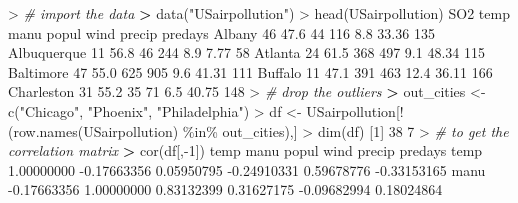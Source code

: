 \documentclass[
]{article}
\newenvironment{Shaded}{\begin{snugshade}}{\end{snugshade}}
\newcommand{\CommentTok}[1]{\textcolor[rgb]{0.56,0.35,0.01}{\textit{#1}}}
\newcommand{\DecValTok}[1]{\textcolor[rgb]{0.00,0.00,0.81}{#1}}
\newcommand{\ErrorTok}[1]{\textcolor[rgb]{0.64,0.00,0.00}{\textbf{#1}}}
\newcommand{\FloatTok}[1]{\textcolor[rgb]{0.00,0.00,0.81}{#1}}
\newcommand{\FunctionTok}[1]{\textcolor[rgb]{0.00,0.00,0.00}{#1}}
\newcommand{\NormalTok}[1]{#1}
\newcommand{\OtherTok}[1]{\textcolor[rgb]{0.56,0.35,0.01}{#1}}
\newcommand{\SpecialCharTok}[1]{\textcolor[rgb]{0.00,0.00,0.00}{#1}}
\newcommand{\StringTok}[1]{\textcolor[rgb]{0.31,0.60,0.02}{#1}}
\begin{document}
\begin{Shaded}
\begin{Highlighting}[]
\SpecialCharTok{\textgreater{}} \CommentTok{\# import the data}
\ErrorTok{\textgreater{}} \FunctionTok{data}\NormalTok{(}\StringTok{"USairpollution"}\NormalTok{)}
\SpecialCharTok{\textgreater{}} \FunctionTok{head}\NormalTok{(USairpollution)}
\NormalTok{            SO2 temp manu popul wind precip predays}
\NormalTok{Albany       }\DecValTok{46} \FloatTok{47.6}   \DecValTok{44}   \DecValTok{116}  \FloatTok{8.8}  \FloatTok{33.36}     \DecValTok{135}
\NormalTok{Albuquerque  }\DecValTok{11} \FloatTok{56.8}   \DecValTok{46}   \DecValTok{244}  \FloatTok{8.9}   \FloatTok{7.77}      \DecValTok{58}
\NormalTok{Atlanta      }\DecValTok{24} \FloatTok{61.5}  \DecValTok{368}   \DecValTok{497}  \FloatTok{9.1}  \FloatTok{48.34}     \DecValTok{115}
\NormalTok{Baltimore    }\DecValTok{47} \FloatTok{55.0}  \DecValTok{625}   \DecValTok{905}  \FloatTok{9.6}  \FloatTok{41.31}     \DecValTok{111}
\NormalTok{Buffalo      }\DecValTok{11} \FloatTok{47.1}  \DecValTok{391}   \DecValTok{463} \FloatTok{12.4}  \FloatTok{36.11}     \DecValTok{166}
\NormalTok{Charleston   }\DecValTok{31} \FloatTok{55.2}   \DecValTok{35}    \DecValTok{71}  \FloatTok{6.5}  \FloatTok{40.75}     \DecValTok{148}
\SpecialCharTok{\textgreater{}} \CommentTok{\# drop the outliers }
\ErrorTok{\textgreater{}}\NormalTok{ out\_cities }\OtherTok{\textless{}{-}} \FunctionTok{c}\NormalTok{(}\StringTok{"Chicago"}\NormalTok{, }\StringTok{"Phoenix"}\NormalTok{, }\StringTok{"Philadelphia"}\NormalTok{)}
\SpecialCharTok{\textgreater{}}\NormalTok{ df }\OtherTok{\textless{}{-}}\NormalTok{ USairpollution[}\SpecialCharTok{!}\NormalTok{(}\FunctionTok{row.names}\NormalTok{(USairpollution) }\SpecialCharTok{\%in\%}\NormalTok{ out\_cities),]}
\SpecialCharTok{\textgreater{}} \FunctionTok{dim}\NormalTok{(df)}
\NormalTok{[}\DecValTok{1}\NormalTok{] }\DecValTok{38}  \DecValTok{7}
\SpecialCharTok{\textgreater{}} \CommentTok{\# to get the correlation matrix}
\ErrorTok{\textgreater{}} \FunctionTok{cor}\NormalTok{(df[,}\SpecialCharTok{{-}}\DecValTok{1}\NormalTok{])}
\NormalTok{               temp        manu       popul        wind      precip     predays}
\NormalTok{temp     }\FloatTok{1.00000000} \SpecialCharTok{{-}}\FloatTok{0.17663356}  \FloatTok{0.05950795} \SpecialCharTok{{-}}\FloatTok{0.24910331}  \FloatTok{0.59678776} \SpecialCharTok{{-}}\FloatTok{0.33153165}
\NormalTok{manu    }\SpecialCharTok{{-}}\FloatTok{0.17663356}  \FloatTok{1.00000000}  \FloatTok{0.83132399}  \FloatTok{0.31627175} \SpecialCharTok{{-}}\FloatTok{0.09682994}  \FloatTok{0.18024864}

\end{Highlighting}
\end{Shaded}
\end{document}
